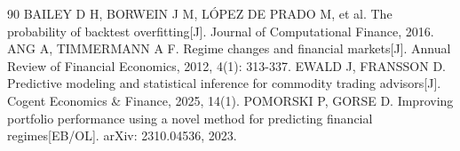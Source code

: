 \documentclass[12pt,a4paper]{ctexart}
\begin{document}
\begin{thebibliography}{90}
 BAILEY D H, BORWEIN J M, LÓPEZ DE PRADO M, et al. The probability of backtest overfitting[J]. Journal of Computational Finance, 2016.
 ANG A, TIMMERMANN A F. Regime changes and financial markets[J]. Annual Review of Financial Economics, 2012, 4(1): 313-337.
 EWALD J, FRANSSON D. Predictive modeling and statistical inference for commodity trading advisors[J]. Cogent Economics \& Finance, 2025, 14(1).
 POMORSKI P, GORSE D. Improving portfolio performance using a novel method for predicting financial regimes[EB/OL]. arXiv: 2310.04536, 2023.
\end{thebibliography}
\end{document}

